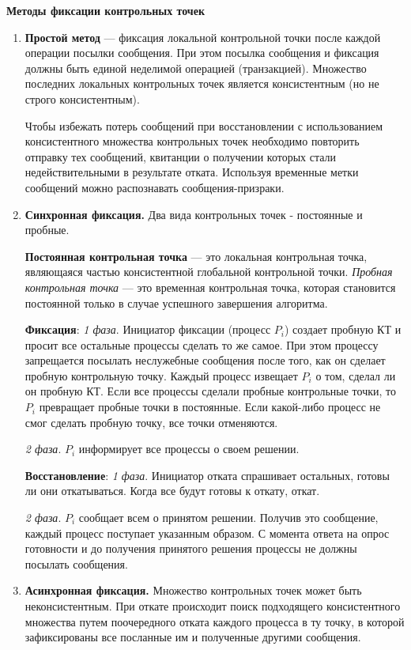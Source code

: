 \textbf{Методы фиксации контрольных точек}

\begin{enumerate}
    \item \textbf{Простой метод} --- фиксация локальной контрольной точки после каждой операции посылки сообщения.
    При этом посылка сообщения и фиксация должны быть единой неделимой операцией (транзакцией).
    Множество последних локальных контрольных точек является консистентным (но не строго консистентным).

    Чтобы избежать потерь сообщений при восстановлении с использованием консистентного множества контрольных точек необходимо повторить отправку тех сообщений, квитанции о получении которых стали недействительными в результате отката.
    Используя временные метки сообщений можно распознавать сообщения-призраки.
    \item \textbf{Синхронная фиксация.}
    Два вида контрольных точек - постоянные и пробные.

    \textbf{Постоянная контрольная точка} --- это локальная контрольная точка, являющаяся частью консистентной глобальной контрольной точки.
    \textit{Пробная контрольная точка} --- это временная контрольная точка, которая становится постоянной только в случае успешного завершения алгоритма.

    \textbf{Фиксация}: \textit{1 фаза}.
    Инициатор фиксации (процесс $P_i$) создает пробную КТ и просит все остальные процессы сделать то же самое.
    При этом процессу запрещается посылать неслужебные сообщения после того, как он сделает пробную контрольную точку.
    Каждый процесс извещает $P_i$ о том, сделал ли он пробную КТ.
    Если все процессы сделали пробные контрольные точки, то $P_i$ превращает пробные точки в постоянные.
    Если какой-либо процесс не смог сделать пробную точку, все точки отменяются.

    \textit{2 фаза}. $P_i$ информирует все процессы о своем решении.

    \textbf{Восстановление}: \textit{1 фаза}.
    Инициатор отката спрашивает остальных, готовы ли они откатываться.
    Когда все будут готовы к откату, откат.

    \textit{2 фаза}.
    $P_i$ сообщает всем о принятом решении.
    Получив это сообщение, каждый процесс поступает указанным образом.
    С момента ответа на опрос готовности и до получения принятого решения процессы не должны посылать сообщения.
    \item \textbf{Асинхронная фиксация.}
    Множество контрольных точек может быть неконсистентным.
    При откате происходит поиск подходящего консистентного множества путем поочередного отката каждого процесса в ту точку, в которой зафиксированы все посланные им и полученные другими сообщения.
\end{enumerate}

